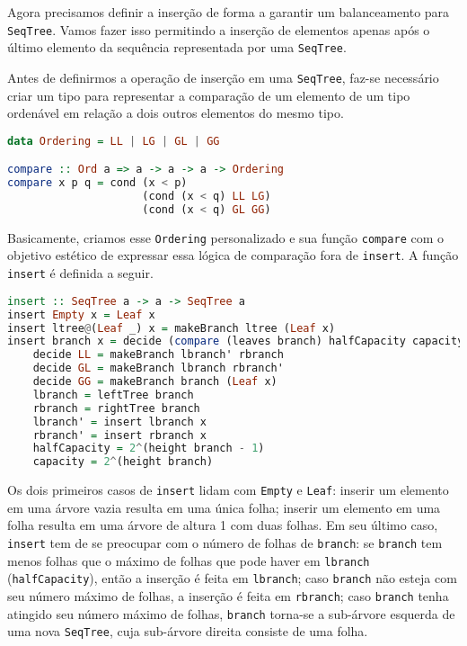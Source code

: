 \documentclass[a4paper]{article}
\begin{document}
Agora precisamos definir a inserção de forma a garantir um balanceamento para \texttt{SeqTree}.
Vamos fazer isso permitindo a inserção de elementos apenas após o último elemento da sequência representada por uma \texttt{SeqTree}. 

Antes de definirmos a operação de inserção em uma \texttt{SeqTree}, faz-se necessário criar um tipo para representar a comparação de um elemento de um tipo ordenável em relação a dois outros elementos do mesmo tipo.

\begin{lstlisting}[language=haskell, frame=single]
data Ordering = LL | LG | GL | GG

compare :: Ord a => a -> a -> a -> Ordering
compare x p q = cond (x < p)
                     (cond (x < q) LL LG)
                     (cond (x < q) GL GG)
\end{lstlisting}

Basicamente, criamos esse \texttt{Ordering} personalizado e sua função \texttt{compare} com o objetivo estético de expressar essa lógica de comparação fora de \texttt{insert}.
A função \texttt{insert} é definida a seguir.

\begin{lstlisting}[language=haskell, frame=single]
insert :: SeqTree a -> a -> SeqTree a
insert Empty x = Leaf x
insert ltree@(Leaf _) x = makeBranch ltree (Leaf x)
insert branch x = decide (compare (leaves branch) halfCapacity capacity) where
	decide LL = makeBranch lbranch' rbranch
	decide GL = makeBranch lbranch rbranch'
	decide GG = makeBranch branch (Leaf x)
	lbranch = leftTree branch
	rbranch = rightTree branch
	lbranch' = insert lbranch x
	rbranch' = insert rbranch x
	halfCapacity = 2^(height branch - 1)
	capacity = 2^(height branch)
\end{lstlisting}

Os dois primeiros casos de \texttt{insert} lidam com \texttt{Empty} e \texttt{Leaf}: inserir um elemento em uma árvore vazia resulta em uma única folha; inserir um elemento em uma folha resulta em uma árvore de altura 1 com duas folhas.
Em seu último caso, \texttt{insert} tem de se preocupar com o número de folhas de \texttt{branch}:
se \texttt{branch} tem menos folhas que o máximo de folhas que pode haver em \texttt{lbranch} (\texttt{halfCapacity}), então a inserção é feita em \texttt{lbranch};
caso \texttt{branch} não esteja com seu número máximo de folhas, a inserção é feita em \texttt{rbranch};
caso \texttt{branch} tenha atingido seu número máximo de folhas, \texttt{branch} torna-se a sub-árvore esquerda de uma nova \texttt{SeqTree}, cuja sub-árvore direita consiste de uma folha.
\end{document}
